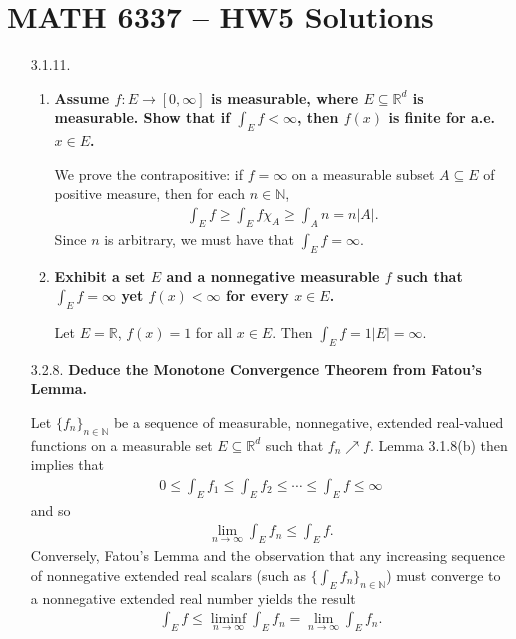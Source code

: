\documentclass[a4paper,12pt]{article}
\begin{document}
\section*{MATH 6337 -- HW5 Solutions}
\begin{enumerate}
    \item[3.1.11.]
        \begin{enumerate}
            \item
                \boldmath\textbf{Assume $f : E \to [0, \infty]$ is measurable, where $E \subseteq \mathbb{R}^d$ is measurable. Show that if $\int_E f < \infty$, then $f(x)$ is finite for a.e. $x \in E$.
                }\unboldmath \par
                We prove the contrapositive: if $f = \infty$ on a measurable subset $A \subseteq E$ of positive measure, then for each $n \in \mathbb{N}$,
                \begin{align*}
                    \int_E f \geq \int_E f \chi_A \geq \int_A n = n|A|.
                \end{align*}
                Since $n$ is arbitrary, we must have that $\int_E f = \infty$.
            \item
                \boldmath\textbf{Exhibit a set $E$ and a nonnegative measurable $f$ such that $\int_E f = \infty$ yet $f(x) < \infty$ for every $x \in E$.
                }\unboldmath \par
                Let $E = \mathbb{R}$, $f(x) = 1$ for all $x \in E$. Then $\int_E f = 1|E| = \infty$.
        \end{enumerate}

    \item[3.2.8.]
        \boldmath\textbf{Deduce the Monotone Convergence Theorem from Fatou's Lemma.
        }\unboldmath \par
        Let $\{f_n\}_{n \in \mathbb{N}}$ be a sequence of measurable, nonnegative, extended real-valued functions on a measurable set $E \subseteq \mathbb{R}^d$ such that $f_n \nearrow f$. Lemma 3.1.8(b) then implies that
        \begin{align*}
            0 \leq \int_E f_1 \leq \int_E f_2 \leq \cdots \leq \int_E f \leq \infty
        \end{align*}
        and so
        \begin{align*}
            \lim_{n \to \infty} \int_E f_n \leq \int_E f.
        \end{align*}
        Conversely, Fatou's Lemma and the observation that any increasing sequence of nonnegative extended real scalars (such as $\{ \int_E f_n \}_{n \in \mathbb{N}}$) must converge to a nonnegative extended real number yields the result
        \begin{align*}
            \int_E f \leq \liminf_{n \to \infty} \int_E f_n = \lim_{n \to \infty} \int_E f_n.
        \end{align*}


\end{enumerate}
\end{document}
